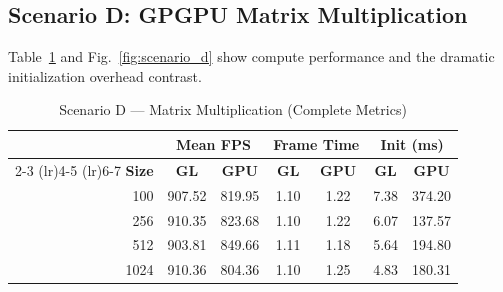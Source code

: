 \documentclass[conference]{IEEEtran}
\begin{document}
\subsection{Scenario D: GPGPU Matrix Multiplication}

Table~\ref{tab:scenario_d} and Fig.~\ref{fig:scenario_d} show compute performance and the dramatic initialization overhead contrast.

\begin{table}[htbp]
\caption{Scenario D --- Matrix Multiplication (Complete Metrics)}
\label{tab:scenario_d}
\centering
\small
\begin{tabular}{@{}rcccccc@{}}
\toprule
 & \multicolumn{2}{c}{\textbf{Mean FPS}} & \multicolumn{2}{c}{\textbf{Frame Time}} & \multicolumn{2}{c}{\textbf{Init (ms)}} \\
\cmidrule(lr){2-3} \cmidrule(lr){4-5} \cmidrule(lr){6-7}
\textbf{Size} & \textbf{GL} & \textbf{GPU} & \textbf{GL} & \textbf{GPU} & \textbf{GL} & \textbf{GPU} \\
\midrule
100 & 907.52 & 819.95 & 1.10 & 1.22 & 7.38 & 374.20 \\
256 & 910.35 & 823.68 & 1.10 & 1.22 & 6.07 & 137.57 \\
512 & 903.81 & 849.66 & 1.11 & 1.18 & 5.64 & 194.80 \\
1024 & 910.36 & 804.36 & 1.10 & 1.25 & 4.83 & 180.31 \\
\bottomrule
\end{tabular}
\end{table}
\end{document}
